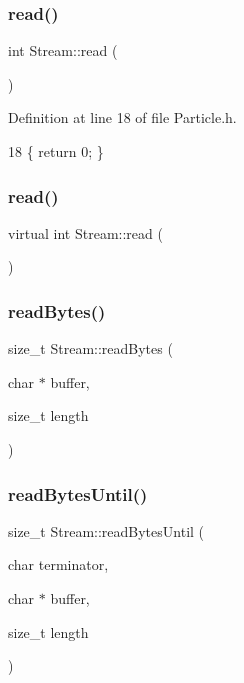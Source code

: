 \mbox{\label{class_stream_a654017caec3e3feeba5feb346d83c7bb}} 
\subsubsection{read()\hspace{0.1cm}{\footnotesize\ttfamily [1/2]}}
{\footnotesize\ttfamily int Stream\+::read (\begin{DoxyParamCaption}{ }\end{DoxyParamCaption})\hspace{0.3cm}{\ttfamily [inline]}}



Definition at line 18 of file Particle.\+h.


\begin{DoxyCode}
18 \{ \textcolor{keywordflow}{return} 0; \}
\end{DoxyCode}
\mbox{\label{class_stream_aea5dee9fcb038148515b7c9212d38dc0}} 
\subsubsection{read()\hspace{0.1cm}{\footnotesize\ttfamily [2/2]}}
{\footnotesize\ttfamily virtual int Stream\+::read (\begin{DoxyParamCaption}{ }\end{DoxyParamCaption})\hspace{0.3cm}{\ttfamily [pure virtual]}}

\mbox{\label{class_stream_a45fd1336a323ea83b16e8507055f44ea}} 
\subsubsection{read\+Bytes()}
{\footnotesize\ttfamily size\+\_\+t Stream\+::read\+Bytes (\begin{DoxyParamCaption}\item[{char $\ast$}]{buffer,  }\item[{size\+\_\+t}]{length }\end{DoxyParamCaption})}

\mbox{\label{class_stream_af84672a4fb2620466958d3118d4fea00}} 
\subsubsection{read\+Bytes\+Until()}
{\footnotesize\ttfamily size\+\_\+t Stream\+::read\+Bytes\+Until (\begin{DoxyParamCaption}\item[{char}]{terminator,  }\item[{char $\ast$}]{buffer,  }\item[{size\+\_\+t}]{length }\end{DoxyParamCaption})}


